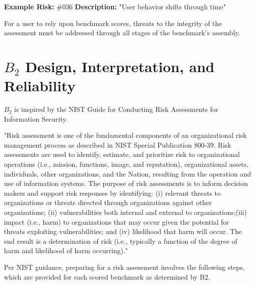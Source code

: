 \documentclass{article}
\begin{document}
\begin{center}
    \begin{tcolorbox}[colback=gray!10, colframe=black!50, width=\textwidth, boxrule=0.5mm, sharp corners, coltext=black]
        {\bf Example Risk:} \#036
        \newline
        {\bf Description:} "User behavior shifts through time"
    \end{tcolorbox}
\end{center}

For a user to rely upon benchmark scores, threats to the integrity of the assessment must be addressed through all stages of the benchmark's assembly.

\section{\(B_2\) Design, Interpretation, and Reliability}
\(B_2\) is inspired by the NIST Guide for Conducting Risk Assessments for Information Security.

\begin{center}
    \begin{tcolorbox}[colback=gray!10, colframe=black!50, width=\textwidth, boxrule=0.5mm, sharp corners, coltext=black]
"Risk assessment is one of the fundamental components of an organizational risk management process as described in NIST Special Publication 800-39. Risk assessments are used to identify, estimate, and prioritize risk to organizational operations (i.e., mission, functions, image, and reputation), organizational assets, individuals, other organizations, and the Nation, resulting from the operation and use of information systems. The purpose of risk assessments is to inform decision makers and support risk responses by identifying: (i) relevant threats to organizations or threats directed through organizations against other organizations; (ii) vulnerabilities both internal and external to organizations;(iii) impact (i.e., harm) to organizations that may occur given the potential for threats exploiting vulnerabilities; and (iv) likelihood that harm will occur. The end result is a determination of risk (i.e., typically a function of the degree of harm and likelihood of harm occurring)."
    \end{tcolorbox}
\end{center}

Per NIST guidance, preparing for a risk assessment involves the following steps, which are provided for each scored benchmark as determined by B2.
\end{document}
